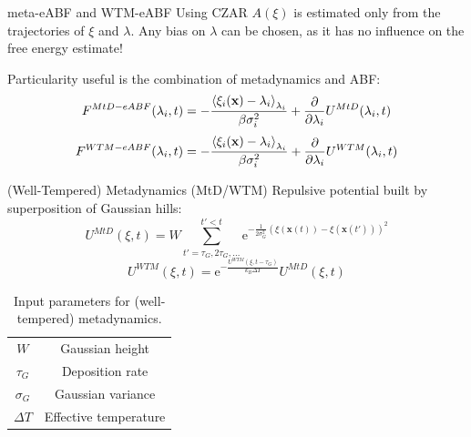\documentclass[10pt]{beamer}
\begin{document}
\begin{frame}{meta-eABF and WTM-eABF}
Using CZAR $A(\xi)$ is estimated only from the trajectories of $\xi$ and $\lambda$. Any bias on $\lambda$ can be chosen, as it has no influence on the free energy estimate!


Particularity useful is the combination of metadynamics and ABF:
\begin{equation}
  F^{MtD-eABF}(\lambda_i, t) = -\frac{\braket{\xi_i(\textbf{x})-\lambda_i}_{\lambda_i}}{\beta \sigma_i^2}+\frac{\partial}{\partial \lambda_i} U^{MtD}(\lambda_i,t)
\end{equation}
\begin{equation}
  F^{WTM-eABF}(\lambda_i, t) = -\frac{\braket{\xi_i(\textbf{x})-\lambda_i}_{\lambda_i}}{\beta \sigma_i^2}+\frac{\partial}{\partial \lambda_i} U^{WTM}(\lambda_i,t)
\end{equation}
\end{frame}

\begin{frame}{(Well-Tempered) Metadynamics (MtD/WTM)}
Repulsive potential built by superposition of Gaussian hills:
\begin{equation}
  U^{MtD}(\xi,t)=W \sum_{t'=\tau_G,2\tau_G,...}^{t'<t} \text{e}^{-\frac{1}{2\sigma_{G}^{2}} (\xi(\textbf{x}(t))-\xi(\textbf{x}(t')))^2 }
\end{equation}
\begin{equation}
  U^{WTM}(\xi,t) = \text{e}^{-\frac{U^{WTM}(\xi,t-\tau_G)}{k_B \Delta T}} U^{MtD}(\xi,t)
\end{equation}
\begin{table}[H]
      \centering
         \caption{Input parameters for (well-tempered) metadynamics.}
         \begin{tabular}{ c  c }
           \hline
                 $W$        & Gaussian height \\
                 $\tau_G$   & Deposition rate \\
                 $\sigma_G$ & Gaussian variance \\
                 $\Delta T$ & Effective temperature \\
           \hline
      \end{tabular}
\end{table}
\end{frame}
\end{document}
